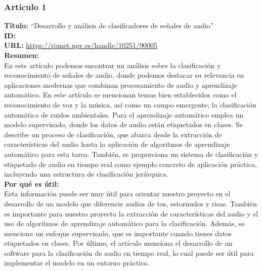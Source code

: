 \subsubsection*{Artículo 1}
\begin{flushleft}
    \textbf{Título:}
    “Desarrollo y análisis de clasificadores de señales de audio”
    \\
    \textbf{ID: \cite{aguirre2017desarrollo}}
    \\
    \textbf{URL:}
    \url{https://riunet.upv.es/handle/10251/90005}
    \\
    \textbf{Resumen:\\}
    En este artículo podemos encontrar un análisis sobre la clasificación y reconocimiento de señales de audio, donde podemos destacar su relevancia en aplicaciones modernas que combinan procesamiento de audio y aprendizaje automático. En este artículo se mencionan temas bien establecidos como el reconocimiento de voz y la música, así como un campo emergente, la clasificación automática de ruidos ambientales. Para el aprendizaje automático emplea un modelo supervisado, donde los datos de audio están etiquetados en clases. Se describe un proceso de clasificación, que abarca desde la extracción de características del audio hasta la aplicación de algoritmos de aprendizaje automático para esta tarea. También, se proporciona un sistema de clasificación y etiquetado de audio en tiempo real como ejemplo concreto de aplicación práctica, incluyendo una estructura de clasificación jerárquica.
    \\
    \textbf{Por qué es útil:\\}
    Esta información puede ser muy útil para orientar nuestro proyecto en el desarrollo de un modelo que diferencie audios de tos, estornudos y risas. También es importante para nuestro proyecto la extracción de características del audio y el uso de algoritmos de aprendizaje automático para la clasificación. Además, se menciona un enfoque supervisado, que es importante cuando tienes datos etiquetados en clases. Por último, el artículo menciona el desarrollo de un software para la clasificación de audio en tiempo real, lo cual puede ser útil para implementar el modelo en un entorno práctico.
\end{flushleft}
